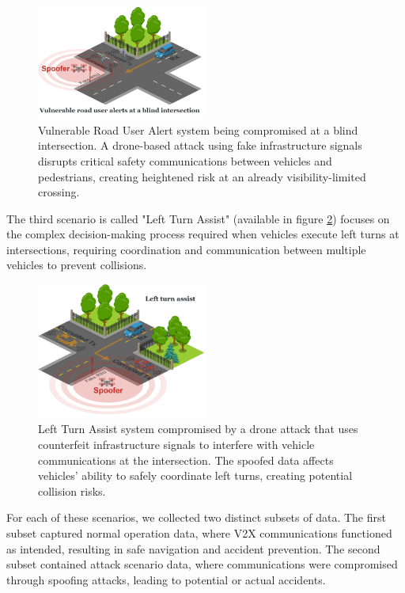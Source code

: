 \begin{figure} [!ht]
    \centering
    \includegraphics[width=0.5\textwidth]{parts/figuras/VulnerableRoadUserAlerts.png}
    \caption{Vulnerable Road User Alert system being compromised at a blind intersection. A drone-based attack using fake infrastructure signals disrupts critical safety communications between vehicles and pedestrians, creating heightened risk at an already visibility-limited crossing.}
    \label{fig:vulnerable-road-user}
\end{figure}

The third scenario is called "Left Turn Assist" (available in figure \ref{fig:left-turn-assist}) focuses on the complex decision-making process required when vehicles execute left turns at intersections, requiring coordination and communication between multiple vehicles to prevent collisions.

\begin{figure} [!ht]
    \centering
    \includegraphics[width=0.5\textwidth]{parts/figuras/LeftTurnAssist.png}
    \caption{Left Turn Assist system compromised by a drone attack that uses counterfeit infrastructure signals to interfere with vehicle communications at the intersection. The spoofed data affects vehicles' ability to safely coordinate left turns, creating potential collision risks.}
    \label{fig:left-turn-assist}
\end{figure}

For each of these scenarios, we collected two distinct subsets of data. The first subset captured normal operation data, where V2X communications functioned as intended, resulting in safe navigation and accident prevention. The second subset contained attack scenario data, where communications were compromised through spoofing attacks, leading to potential or actual accidents.

